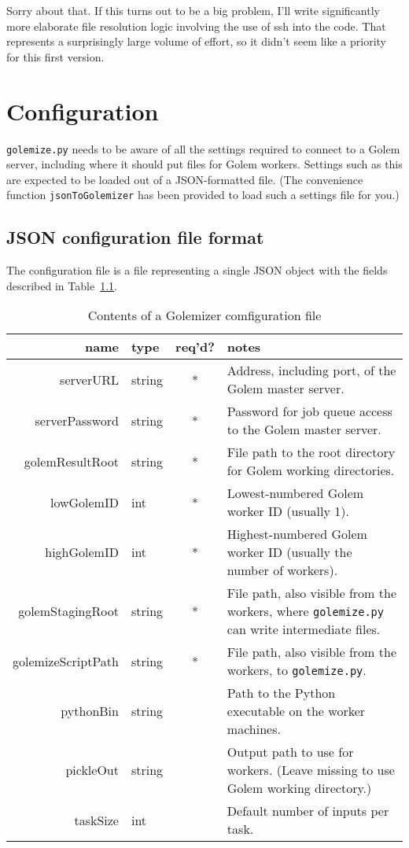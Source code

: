 \documentclass[11pt,ebook,oneside,final]{memoir} %
\begin{document}
Sorry about that. If this turns out to be a big problem, I'll write significantly more elaborate file resolution logic involving the use of ssh into the code. That represents a surprisingly large volume of effort, so it didn't seem like a priority for this first version.

\chapter{Configuration}
\texttt{golemize.py} needs to be aware of all the settings required to connect to a Golem server, including where it should put files for Golem workers. Settings such as this are expected to be loaded out of a JSON-formatted file. (The convenience function \texttt{jsonToGolemizer} has been provided to load such a settings file for you.)
\section{JSON configuration file format}
The configuration file is a file representing a single JSON object with the fields described in Table~\ref{config_table}.
\begin{table}
	\caption{Contents of a Golemizer comfiguration file}
	\begin{tabular}{r|lc||p{2in}}
		name & type & req'd? & notes \\ \hline
		serverURL & string & * & Address, including port, of the Golem master server.\\
		serverPassword & string & * & Password for job queue access to the Golem master server.\\
		golemResultRoot & string & * & File path to the root directory for Golem working directories.\\
		lowGolemID & int & * & Lowest-numbered Golem worker ID (usually 1).\\
		highGolemID & int & * & Highest-numbered Golem worker ID (usually the number of workers).\\
		golemStagingRoot & string & * & File path, also visible from the workers, where \texttt{golemize.py} can write intermediate files.\\
		golemizeScriptPath & string & * & File path, also visible from the workers, to \texttt{golemize.py}.\\
		pythonBin & string & & Path to the Python executable on the worker machines.\\
		pickleOut & string & & Output path to use for workers. (Leave missing to use Golem working directory.)\\
		taskSize & int & & Default number of inputs per task. \\ \hline
	\end{tabular}
	\label{config_table}
\end{table}
\end{document}
